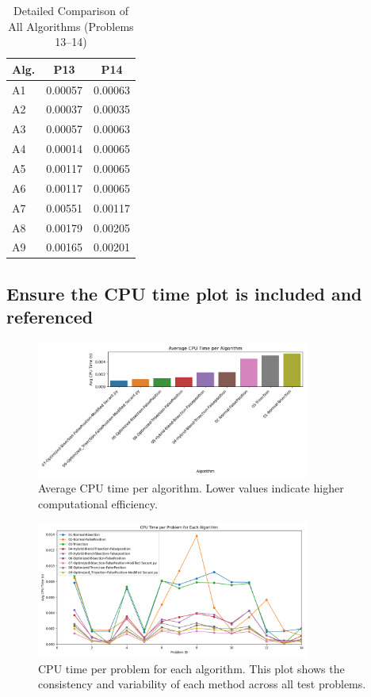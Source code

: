\documentclass[reprint, amsmath, amssymb, aps, prl]{revtex4-2}
\begin{document}
\begin{table}[H]
\centering
\caption{Detailed Comparison of All Algorithms (Problems 13--14)}
\label{tab:detailed_comparison_4}
\begin{tabular}{lcc}
\toprule
Alg. & P13 & P14 \\
\midrule
A1 & 0.00057 & 0.00063 \\
A2 & 0.00037 & 0.00035 \\
A3 & 0.00057 & 0.00063 \\
A4 & 0.00014 & 0.00065 \\
A5 & 0.00117 & 0.00065 \\
A6 & 0.00117 & 0.00065 \\
A7 & 0.00551 & 0.00117 \\
A8 & 0.00179 & 0.00205 \\
A9 & 0.00165 & 0.00201 \\
\bottomrule
\end{tabular}
\end{table}

\subsection{Ensure the CPU time plot is included and referenced}

\begin{figure}[H]
    \centering
    \includegraphics[width=0.8\textwidth]{avg_cpu_time_per_algorithm.png}
    \caption{Average CPU time per algorithm. Lower values indicate higher computational efficiency.}
    \label{fig:avg_cpu_time_per_algorithm}
\end{figure}

\begin{figure}[H]
    \centering
    \includegraphics[width=0.8\textwidth]{cpu_time_lineplot_per_problem.png}
    \caption{CPU time per problem for each algorithm. This plot shows the consistency and variability of each method across all test problems.}
    \label{fig:cpu_time_lineplot_per_problem}
\end{figure}
\end{document}

